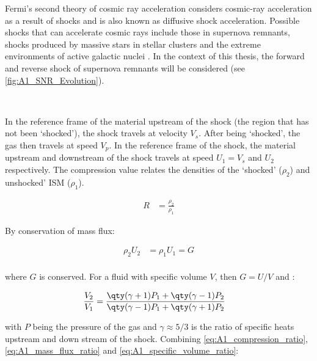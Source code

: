 Fermi's second theory of cosmic ray acceleration considers cosmic-ray acceleration as a result of shocks and is also known as diffusive shock acceleration. Possible shocks that can accelerate cosmic rays include those in supernova remnants, shocks produced by massive stars in stellar clusters and the extreme environments of active galactic nuclei \citep{2002cra..book.....S}. In the context of this thesis, the forward and reverse shock of supernova remnants will be considered (see \autoref{fig:A1_SNR_Evolution}).
\par~\par
In the reference frame of the material upstream of the shock (the region that has not been `shocked'), the shock travels at velocity $V_s$. After being `shocked', the gas then travels at speed $V_p$. In the reference frame of the shock, the material upstream and downstream of the shock travels at speed $U_1=V_s$ and $U_2$ respectively. The compression value relates the densities of the `shocked' ($\rho_2$) and unshocked' ISM ($\rho_1$).

\begin{equation}
    \begin{aligned}
    R&=\frac{\rho_2}{\rho_1}
    \end{aligned} \label{eq:A1_compression_ratio}
\end{equation}

\noindent By conservation of mass flux:

\begin{equation}
    \begin{aligned}
    \rho_2U_2&=\rho_1U_1=G \\
    \end{aligned} \label{eq:A1_mass_flux_ratio}
\end{equation}

\noindent where $G$ is conserved. For a fluid with specific volume $V$, then $G=U/V$ and \citep{2002cra..book.....S}:

\begin{equation}
    \begin{aligned}
        \frac{V_2}{V_1}&=\frac{\qty(\gamma+1)P_1+\qty(\gamma-1)P_2}{\qty(\gamma-1)P_1+\qty(\gamma+1)P_2} 
    \end{aligned} \label{eq:A1_specific_volume_ratio}
\end{equation}

\noindent with $P$  being the pressure of the gas and $\gamma\approx 5/3$ is the ratio of specific heats upstream and down stream of the shock. Combining \autoref{eq:A1_compression_ratio}, \autoref{eq:A1_mass_flux_ratio} and \autoref{eq:A1_specific_volume_ratio}:

